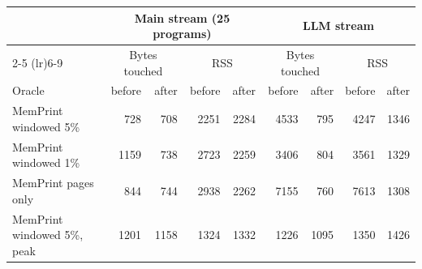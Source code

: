 \begin{tabular}{lrrrrrrrr}
\toprule
 & \multicolumn{4}{c}{Main stream (25 programs)} & \multicolumn{4}{c}{LLM stream} \\
\cmidrule(lr){2-5} \cmidrule(lr){6-9}
 & \multicolumn{2}{c}{Bytes touched} & \multicolumn{2}{c}{RSS} & \multicolumn{2}{c}{Bytes touched} & \multicolumn{2}{c}{RSS} \\
Oracle & before & after & before & after & before & after & before & after \\
\midrule
MemPrint windowed 5\% & 728 & 708 & 2251 & 2284 & 4533 & 795 & 4247 & 1346 \\
MemPrint windowed 1\% & 1159 & 738 & 2723 & 2259 & 3406 & 804 & 3561 & 1329 \\
MemPrint pages only & 844 & 744 & 2938 & 2262 & 7155 & 760 & 7613 & 1308 \\
MemPrint windowed 5\%, peak & 1201 & 1158 & 1324 & 1332 & 1226 & 1095 & 1350 & 1426 \\
\bottomrule
\end{tabular}

